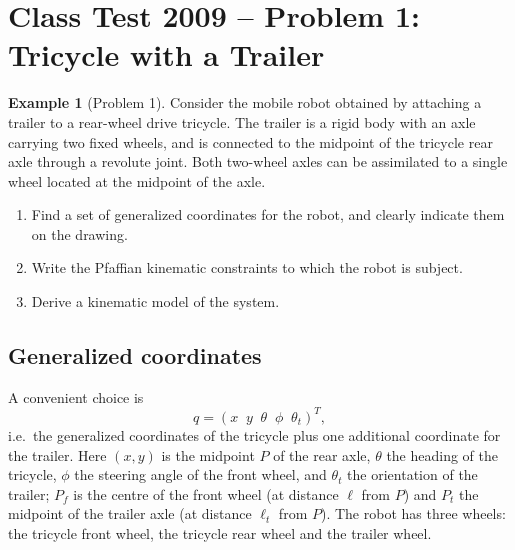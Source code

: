 \documentclass[11pt,a4paper]{article}
\def\bm#1{#1}%
\newcommand{\qv}{\bm{q}}
\theoremstyle{definition}
\newtheorem{example}[definition]{Example}
\theoremstyle{plain}
\theoremstyle{remark}
\begin{document}
\section{Class Test 2009 -- Problem 1: Tricycle with a Trailer}\label{sec:test}

\begin{example}[Problem 1]
Consider the mobile robot obtained by attaching a trailer to a rear-wheel drive tricycle. The trailer is a rigid body with an axle carrying two fixed wheels, and is connected to the midpoint of the tricycle rear axle through a revolute joint. Both two-wheel axles can be assimilated to a single wheel located at the midpoint of the axle.
\begin{enumerate}[nosep]
 \item Find a set of generalized coordinates for the robot, and clearly indicate them on the drawing.
 \item Write the Pfaffian kinematic constraints to which the robot is subject.
 \item Derive a kinematic model of the system.
\end{enumerate}
\end{example}

\subsection{Generalized coordinates}

A convenient choice is
\[
 \qv=(x\;\;y\;\;\theta\;\;\phi\;\;\theta_t)^T,
\]
i.e.\ the generalized coordinates of the tricycle plus one additional coordinate for the trailer. Here $(x,y)$ is the midpoint $P$ of the rear axle, $\theta$ the heading of the tricycle, $\phi$ the steering angle of the front wheel, and $\theta_t$ the orientation of the trailer; $P_f$ is the centre of the front wheel (at distance $\ell$ from $P$) and $P_t$ the midpoint of the trailer axle (at distance $\ell_t$ from $P$). The robot has three wheels: the tricycle front wheel, the tricycle rear wheel and the trailer wheel.
\end{document}
